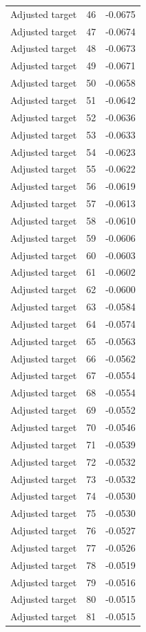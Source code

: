 \begin{table}[htbp]
\begin{tabular}{lll}
Adjusted target & 46 & -0.0675 \\
Adjusted target & 47 & -0.0674 \\
Adjusted target & 48 & -0.0673 \\
Adjusted target & 49 & -0.0671 \\
Adjusted target & 50 & -0.0658 \\
Adjusted target & 51 & -0.0642 \\
Adjusted target & 52 & -0.0636 \\
Adjusted target & 53 & -0.0633 \\
Adjusted target & 54 & -0.0623 \\
Adjusted target & 55 & -0.0622 \\
Adjusted target & 56 & -0.0619 \\
Adjusted target & 57 & -0.0613 \\
Adjusted target & 58 & -0.0610 \\
Adjusted target & 59 & -0.0606 \\
Adjusted target & 60 & -0.0603 \\
Adjusted target & 61 & -0.0602 \\
Adjusted target & 62 & -0.0600 \\
Adjusted target & 63 & -0.0584 \\
Adjusted target & 64 & -0.0574 \\
Adjusted target & 65 & -0.0563 \\
Adjusted target & 66 & -0.0562 \\
Adjusted target & 67 & -0.0554 \\
Adjusted target & 68 & -0.0554 \\
Adjusted target & 69 & -0.0552 \\
Adjusted target & 70 & -0.0546 \\
Adjusted target & 71 & -0.0539 \\
Adjusted target & 72 & -0.0532 \\
Adjusted target & 73 & -0.0532 \\
Adjusted target & 74 & -0.0530 \\
Adjusted target & 75 & -0.0530 \\
Adjusted target & 76 & -0.0527 \\
Adjusted target & 77 & -0.0526 \\
Adjusted target & 78 & -0.0519 \\
Adjusted target & 79 & -0.0516 \\
Adjusted target & 80 & -0.0515 \\
Adjusted target & 81 & -0.0515 \\

\end{tabular}
\end{table}
